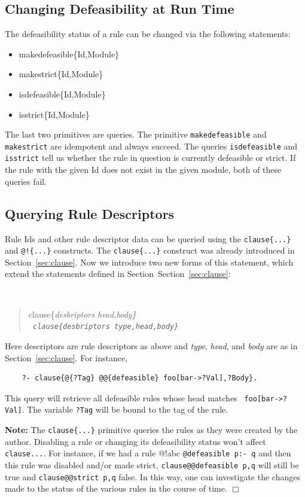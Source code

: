 \documentclass[11pt]{article}
\begin{document}
\subsection{Changing Defeasibility at Run Time}
The defeasibility status of a rule can be changed via the following
statements:
\begin{itemize}
\item  makedefeasible\{Id,Module\}
\item  makestrict\{Id,Module\}
\item  isdefeasible\{Id,Module\}
\item  isstrict\{Id,Module\}
\end{itemize}
The last two primitives are queries. The primitive \texttt{makedefeasible}
and \texttt{makestrict} are idempotent and always succeed. The queries
\texttt{isdefeasible} and \texttt{isstrict} tell us whether the rule in
question is currently defeasible or strict.    
If the rule with the given Id does not exist in the given module, both of
these queries fail.

\subsection{Querying Rule Descriptors}
Rule Ids and other rule descriptor
data can be queried using the  \texttt{clause\{...\}}
and \texttt{@!\{...\}} constructs. The  \texttt{clause\{...\}}
construct was already
introduced in Section~\ref{sec:clause}. Now we introduce two new forms of this
statement, which extend the statements
defined in Section~Section~\ref{sec:clause}:
{\tt
\begin{quote}
clause\{\it{desbriptors head,body}\}\\
\tt
clause\{\it{desbriptors type,head,body}\}
\end{quote}
}
Here descriptors are rule descriptors as above and
\emph{type}, \emph{head}, and \emph{body} are as in
Section~\ref{sec:clause}. 
For instance,
\begin{verbatim}
    ?- clause{@{?Tag} @@{defeasible} foo[bar->?Val],?Body}.
\end{verbatim}
This query will retrieve all defeasible rules whose head matches {\tt
  foo[bar->?Val]}. The variable \texttt{?Tag} will be bound to the tag of
the rule. 

\noindent
\textbf{Note:} The \texttt{clause\{...\}} primitive queries the rules as
they were created by the author. Disabling a rule or changing its
defeasibility status won't affect \texttt{clause{...}}.
For instance, if we had a
rule @!{abc} \texttt{@{defeasible} p:- q}
and then this rule was disabled and/or
made strict, \texttt{clause{@@{defeasible} p,q}}
will still be true and
\texttt{clause{@@{strict} p,q}} 
false. In this way, one can investigate the changes
made to the status of the various rules in the course of time.   
\hfill $\Box$
\end{document}
